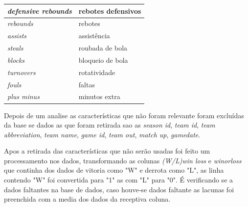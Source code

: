 \begin{table}[htbp]
\begin{longtable}{|l|l|}
		\textit{defensive rebounds}            & rebotes defensivos                                                                                                                                \\ \hline
		\textit{rebounds}                      & rebotes                                                                                                                                           \\ \hline
		\textit{assists}                       & assistência                                                                                                                                       \\ \hline
		\textit{steals}                        & roubada de bola                                                                                                                                   \\ \hline
		\textit{blocks}                        & bloqueio de bola                                                                                                                                  \\ \hline
		\textit{turnovers}                     & rotatividade                                                                                                                                      \\ \hline
		\textit{fouls}                         & faltas                                                                                                                                            \\ \hline
		\textit{plus minus}                    & minutos extra    \\ \hline                                                                       
	\end{longtable}
\end{table}

 Depois de um analise as características que não foram relevante foram excluídas da base se dados as que foram retirada sao as \textit{season id}, \textit{team id}, \textit{team abbreviation}, \textit{team name}, \textit{game id}, \textit{team out}, \textit{match up}, \textit{gamedate}.
 


 


Apos a retirada das características que não serão usadas foi feito um processamento nos dados, transformando as colunas \textit{(W/L)win loss} e \textit{winorloss} que continha dos dados de vitoria como "W" e derrota como "L", as linha contendo "W" foi convertida para "1" as com "L" para "0". É verificando se a dados faltantes na base de dados, caso houve-se dados faltante  as lacunas foi preenchida com a media dos dados da receptiva coluna.

